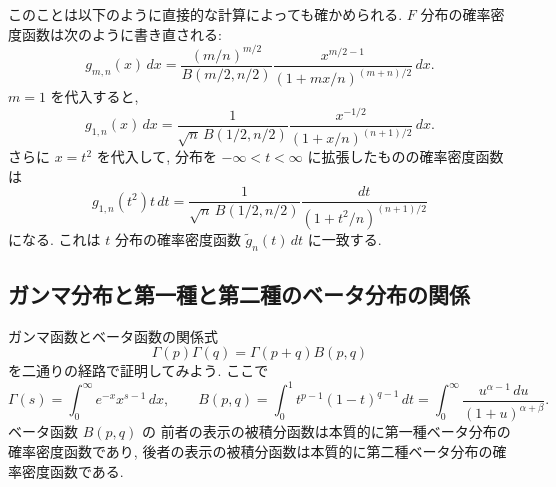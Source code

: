 \documentclass[12pt,twoside]{jarticle}
\newcommand\tg{{\tilde g}}
\theoremstyle{jplain}
\theoremstyle{jplain}
\theoremstyle{jplain}
\numberwithin{theorem}{section}
\numberwithin{equation}{section}
\numberwithin{figure}{section}
\numberwithin{table}{section}
\begin{document}
このことは以下のように直接的な計算によっても確かめられる.
$F$ 分布の確率密度函数は次のように書き直される:
\[
g_{m,n}(x)\,dx
=
\frac{(m/n)^{m/2}}{B(m/2,n/2)}
\frac{x^{m/2-1}}{(1+mx/n)^{(m+n)/2}}
\,dx.
\]
$m=1$ を代入すると, 
\[
g_{1,n}(x)\,dx
=
\frac{1}{\sqrt{n}\,B(1/2,n/2)}
\frac{x^{-1/2}}{(1+x/n)^{(n+1)/2}}
\,dx.
\]
さらに $x=t^2$ を代入して, 
分布を $-\infty<t<\infty$ に拡張したものの確率密度函数は
\[
g_{1,n}(t^2)t\,dt
= 
\frac{1}{\sqrt{n}\,B(1/2,n/2)}
\frac{dt}{(1+t^2/n)^{(n+1)/2}}
\]
になる.  これは $t$ 分布の確率密度函数 $\tg_n(t)\,dt$ に一致する.



\subsection{ガンマ分布と第一種と第二種のベータ分布の関係}
\label{sec:Betas}

ガンマ函数とベータ函数の関係式
\[
\Gamma(p)\Gamma(q) = \Gamma(p+q)B(p,q)
\]
を二通りの経路で証明してみよう. ここで
\[
\Gamma(s)=\int_0^\infty e^{-x}x^{s-1}\,dx, \qquad
B(p,q)
=\int_0^1 t^{p-1}(1-t)^{q-1}\,dt
=\int_0^\infty \frac{u^{\alpha-1}\,du}{(1+u)^{\alpha+\beta}}.
\]
ベータ函数 $B(p,q)$ の
前者の表示の被積分函数は本質的に第一種ベータ分布の確率密度函数であり, 
後者の表示の被積分函数は本質的に第二種ベータ分布の確率密度函数である.
\end{document}
